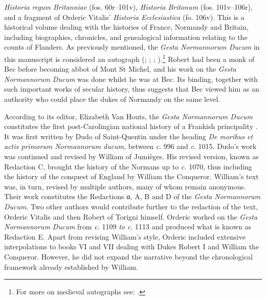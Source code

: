 \documentclass{article}
\begin{document}
\emph{Historia regum Britanniae} (fos. 60r--101v), \emph{Historia
Britonum} (fos. 101v--106r), and a fragment of Orderic Vitalis'
\emph{Historia Ecclesiastica} (fo. 106v). This is a historical volume
dealing with the histories of France, Normandy and Britain, including
biographies, chronicles, and genealogical information relating to the
counts of Flanders. As previously mentioned, the \emph{Gesta Normannorum
Ducum} in this manuscript is considered an autograph (\cite[cix]{van_houts_gesta_1992}; \cite[24]{crick_historia_1991}; \cite[69]{lieftinck_manuscrits_1964}; \cite[80]{hermans_history_1983}).\footnote{For more on medieval autographs see: \cite{overgaauw_comment_2013}.}
Robert had been a monk of Bec before becoming abbot of Mont St
Michel, and his work on the \emph{Gesta Normannorum Ducum} was done
whilst he was at Bec. Its binding, together with such important works of
secular history, thus suggests that Bec viewed him as an authority who
could place the dukes of Normandy on the same level.

According to its editor, Elizabeth Van Houts, the \emph{Gesta
Normannorum Ducum} constitutes the first post-Carolingian national
history of a Frankish principality \citep[xix]{van_houts_gesta_1992}. It was first
written by Dudo of Saint-Quentin under the heading \emph{De moribus et
actis primorum Normannorum ducum}, between \emph{c}. 996 and \emph{c}.
1015. Dudo's work was continued and revised by William of Jumièges. His
revised version, known as Redaction C, brought the history of the
Normans up to \emph{c.} 1070, thus including the history of the conquest
of England by William the Conqueror. William's text was, in turn,
revised by multiple authors, many of whom remain anonymous. Their work
constitutes the Redactions α, A, B and D of the \emph{Gesta Normannorum
Ducum}. Two other authors would contribute further to the redaction of
the text, Orderic Vitalis and then Robert of Torigni himself. Orderic
worked on the \emph{Gesta Normannorum Ducum} from \emph{c.} 1109
\emph{to c}. 1113 and produced what is known as Redaction E. Apart from
revising William's style, Orderic included extensive interpolations to
books VI and VII dealing with Dukes Robert I and William the Conqueror.
However, he did not expand the narrative beyond the chronological
framework already established by William.
\end{document}
